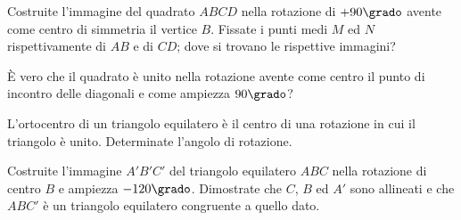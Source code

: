 \begin{esercizio}
\label{ese:8.59} %
Costruite l'immagine del quadrato $ABCD$ nella rotazione di 
$+90\grado$ avente come centro di simmetria il vertice $B$.
Fissate i punti medi $M$ ed $N$ rispettivamente di $AB$ e di $CD$; 
dove si trovano le rispettive immagini?
\end{esercizio}

\begin{esercizio}
\label{ese:8.60} %
\`E vero che il quadrato è unito nella rotazione avente come centro 
il punto di incontro delle diagonali e come ampiezza $90\grado$?
\end{esercizio}

\begin{esercizio}
\label{ese:8.61} %
L'ortocentro di un triangolo equilatero è il centro di una rotazione 
in cui il triangolo è unito. Determinate l'angolo di rotazione.
\end{esercizio}

\begin{esercizio}
\label{ese:8.62} %
Costruite l'immagine $A'B'C'$ del triangolo equilatero $ABC$ nella 
rotazione di centro $B$ e ampiezza $-120\grado$. Dimostrate che $C$, 
$B$ ed $A'$ sono allineati e che $ABC'$ è un triangolo equilatero 
congruente a quello dato.
\end{esercizio}

